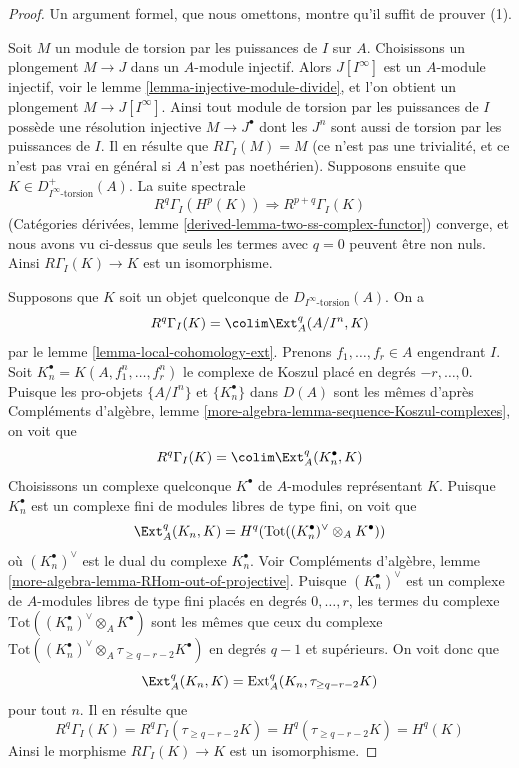 \begin{proof}
Un argument formel, que nous omettons, montre qu'il suffit de prouver (1).

\medskip\noindent
Soit $M$ un module de torsion par les puissances de $I$ sur $A$.
Choisissons un plongement $M \to J$ dans un $A$-module injectif.
Alors $J[I^\infty]$ est un $A$-module injectif, voir le lemme \ref{lemma-injective-module-divide},
et l'on obtient un plongement $M \to J[I^\infty]$.
Ainsi tout module de torsion par les puissances de $I$
possède une résolution injective $M \to J^\bullet$ dont les $J^n$
sont aussi de torsion par les puissances de $I$.
Il en résulte que $R\Gamma_I(M) = M$ (ce n'est pas une trivialité,
et ce n'est pas vrai en général si $A$ n'est pas noethérien).
Supposons ensuite que $K \in D_{I^\infty\text{-torsion}}^+(A)$. La suite spectrale
$$
R^q\Gamma_I(H^p(K)) \Rightarrow R^{p + q}\Gamma_I(K)
$$
(Catégories dérivées, lemme \ref{derived-lemma-two-ss-complex-functor}) converge,
et nous avons vu ci-dessus que seuls les termes avec $q = 0$
peuvent être non nuls. Ainsi $R\Gamma_I(K) \to K$ est un isomorphisme.

\medskip\noindent
Supposons que $K$ soit un objet quelconque de $D_{I^\infty\text{-torsion}}(A)$.
On a
$$
R^q\Gamma_I(K) = \colim \Ext^q_A(A/I^n, K)
$$
par le lemme \ref{lemma-local-cohomology-ext}. Prenons $f_1, \ldots, f_r \in A$ engendrant $I$.
Soit $K_n^\bullet = K(A, f_1^n, \ldots, f_r^n)$ le complexe de Koszul placé en degrés $-r, \ldots, 0$.
Puisque les pro-objets $\{A/I^n\}$ et $\{K_n^\bullet\}$ dans $D(A)$ sont les mêmes
d'après Compléments d'algèbre, lemme \ref{more-algebra-lemma-sequence-Koszul-complexes}, on voit que
$$
R^q\Gamma_I(K) = \colim \Ext^q_A(K_n^\bullet, K)
$$
Choisissons un complexe quelconque $K^\bullet$ de $A$-modules représentant $K$.
Puisque $K_n^\bullet$ est un complexe fini de modules libres de type fini,
on voit que
$$
\Ext^q_A(K_n, K) =
H^q(\text{Tot}((K_n^\bullet)^\vee \otimes_A K^\bullet))
$$
où $(K_n^\bullet)^\vee$ est le dual du complexe $K_n^\bullet$.
Voir Compléments d'algèbre, lemme \ref{more-algebra-lemma-RHom-out-of-projective}.
Puisque $(K_n^\bullet)^\vee$ est un complexe de $A$-modules libres de type fini
placés en degrés $0, \ldots, r$, les termes du complexe $\text{Tot}((K_n^\bullet)^\vee \otimes_A K^\bullet)$
sont les mêmes que ceux du complexe $\text{Tot}((K_n^\bullet)^\vee \otimes_A \tau_{\geq q - r - 2} K^\bullet)$
en degrés $q - 1$ et supérieurs. On voit donc que
$$
\Ext^q_A(K_n, K) = \text{Ext}^q_A(K_n, \tau_{\geq q - r - 2}K)
$$
pour tout $n$. Il en résulte que
$$
R^q\Gamma_I(K) = R^q\Gamma_I(\tau_{\geq q - r - 2}K) =
H^q(\tau_{\geq q - r - 2}K) = H^q(K)
$$
Ainsi le morphisme $R\Gamma_I(K) \to K$ est un isomorphisme.
\end{proof}

